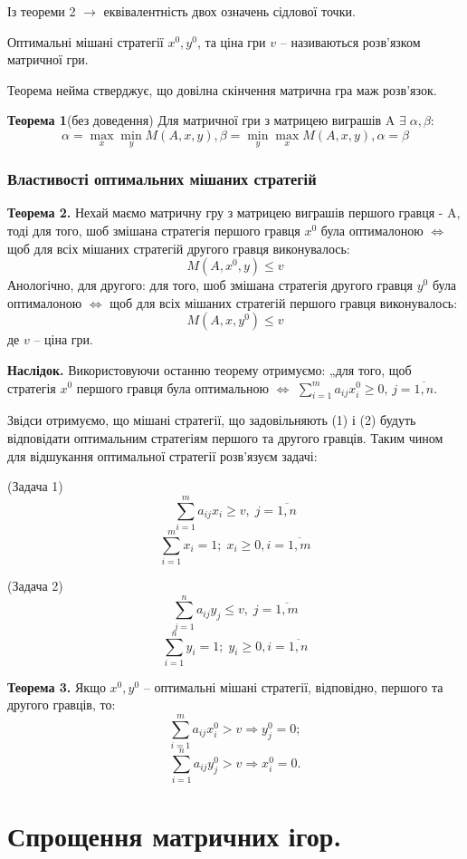 \documentclass[12pt,a4paper]{report}
\begin{document}
Із теореми 2 $\to$ еквівалентність двох означень сідлової точки.

Оптимальні мішані стратегії $x^0, y^0$, та ціна гри $v$ -- називаються розв'язком матричної гри.

Теорема нейма стверджує, що довілна скінчення матрична гра маж розв'язок.

{\bf Теорема 1}(без доведення)
Для матричної гри з матрицею виграшів A $\exists \; \alpha, \beta$:
\[\alpha = \max_x\min_y M(A, x, y), \beta=\min_y\max_x M(A, x, y), \alpha = \beta\]

\subsection*{Властивості оптимальних мішаних стратегій}

{\bf Теорема 2.}
Нехай маємо матричну гру з матрицею виграшів першого гравця - A, тоді для того, шоб змішана стратегія першого гравця $x^0$ була оптималоною $\iff$ щоб для всіх мішаних стратегій другого гравця виконувалось:
\[M(A,x^0,y)\le v\]
Анологічно, для другого: для того, шоб змішана стратегія другого гравця $y^0$ була оптималоною $\iff$ щоб для всіх мішаних стратегій першого гравця виконувалось:
\[M(A,x,y^0)\le v\]
 де $v$ -- ціна гри.

{\bf Наслідок.}
Використовуючи останню теорему отримуємо: „для того, щоб стратегія $x^0$ першого гравця була оптимальною $\iff$ $\sum_{i=1}^m a_{ij} x_i^0 \ge 0, \, j=\overline{1, n}$.

Звідси отримуємо, що мішані стратегії, що задовільняють (1) і (2) будуть відповідати оптимальним стратегіям першого та другого гравців. Таким чином для відшукання оптимальної стратегії розв'язуєм задачі:

(Задача 1)
\[\sum_{i=1}^m a_{ij}x_i \ge v, \; j=\overline{1, n}\]
\[\sum_{i=1}^m x_i = 1; \; x_i \ge 0, i =\overline{1, m} \]

(Задача 2)
\[\sum_{j=1}^n a_{ij}y_j \le v, \; j=\overline{1, m}\]
\[\sum_{i=1}^n y_i = 1; \; y_i \ge 0, i =\overline{1, n} \]

{\bf Теорема 3.}
Якщо $x^0, y^0$ -- оптимальні мішані стратегії, відповідно, першого та другого гравців, то:
\[\sum_{i=1}^m a_{ij} x_i^0 > v \Rightarrow y_j^0 = 0;\]
\[\sum_{i=1}^n a_{ij} y_j^0 > v \Rightarrow x_i^0 = 0.\]

\clearpage

\chapter{Спрощення матричних ігор.}
\end{document}
